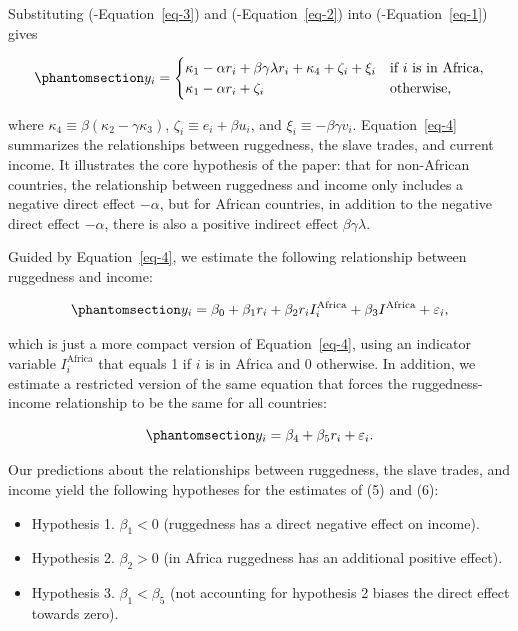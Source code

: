 \documentclass[
  letterpaper,
  DIV=11,
  numbers=noendperiod]{scrartcl}
\providecommand{\tightlist}{%
  \setlength{\itemsep}{0pt}\setlength{\parskip}{0pt}}\usepackage{longtable,booktabs,array}
\begin{document}
Substituting (-Equation~\ref{eq-3}) and (-Equation~\ref{eq-2}) into
(-Equation~\ref{eq-1}) gives

\begin{equation}\phantomsection\label{eq-4}{
y_i = \begin{cases}
\kappa_1 - \alpha r_i + \beta \gamma \lambda r_i + \kappa_4 + \zeta_i + \xi_i &\text{if }i\text{ is in Africa}, \\
\kappa_1 - \alpha r_i + \zeta_i &\text{otherwise},
\end{cases}
}\end{equation}

where \(\kappa_4 \equiv \beta(\kappa_2 − \gamma \kappa_3)\),
\(\zeta_i \equiv e_i + \beta u_i\), and
\(\xi_i \equiv −\beta \gamma v_i\). Equation~\ref{eq-4} summarizes the
relationships between ruggedness, the slave trades, and current income.
It illustrates the core hypothesis of the paper: that for non-African
countries, the relationship between ruggedness and income only includes
a negative direct effect \(−\alpha\), but for African countries, in
addition to the negative direct effect \(−\alpha\), there is also a
positive indirect effect \(\beta \gamma \lambda\).

Guided by Equation~\ref{eq-4}, we estimate the following relationship
between ruggedness and income:

\begin{equation}\phantomsection\label{eq-5}{
y_i = \beta_0 + \beta_1 r_i + \beta_2 r_i I_i^\text{Africa} + \beta_3 I^\text{Africa} + \varepsilon_i,
}\end{equation}

which is just a more compact version of Equation~\ref{eq-4}, using an
indicator variable \(I_i^\text{Africa}\) that equals 1 if \(i\) is in
Africa and 0 otherwise. In addition, we estimate a restricted version of
the same equation that forces the ruggedness-income relationship to be
the same for all countries:

\begin{equation}\phantomsection\label{eq-6}{
y_i = \beta_4 + \beta_5 r_i + \varepsilon_i.
}\end{equation}

Our predictions about the relationships between ruggedness, the slave
trades, and income yield the following hypotheses for the estimates of
(5) and (6):

\begin{itemize}
\tightlist
\item
  Hypothesis 1. \(\beta_1 < 0\) (ruggedness has a direct negative effect
  on income).
\item
  Hypothesis 2. \(\beta_2 > 0\) (in Africa ruggedness has an additional
  positive effect).
\item
  Hypothesis 3. \(\beta_1 < \beta_5\) (not accounting for hypothesis 2
  biases the direct effect towards zero).
\end{itemize}
\end{document}
